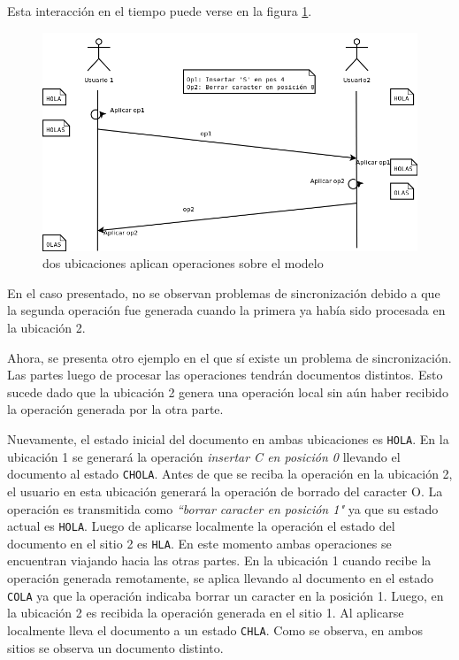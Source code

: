 \documentclass[12pt,a4paper]{article}
\begin{document}
	Esta interacción en el tiempo puede verse en la figura \ref{secuencia_ops_1}.

	\begin{figure}[!ht]
		\begin{center}
			\includegraphics[width=14cm]{sincronizacion_ok.png}
			\caption{\label{secuencia_ops_1} dos ubicaciones aplican operaciones sobre el modelo }
		\end{center}
	\end{figure}

	En el caso presentado, no se observan problemas de sincronización debido a que la segunda operación fue 
	generada cuando la primera ya había sido procesada en la ubicación 2.

	Ahora, se presenta otro ejemplo en el que sí existe un problema de sincronización. Las partes luego de procesar
	las operaciones tendrán documentos distintos. Esto sucede dado que la ubicación 2 genera una operación local 
	sin aún haber recibido la operación generada por la otra parte.
	
	Nuevamente, el estado inicial del documento en ambas ubicaciones es \texttt{HOLA}. En la ubicación 1
	se generará la operación \textit{insertar C en posición 0} llevando el documento al estado \texttt{CHOLA}.
	Antes de que se reciba la operación en la ubicación 2, el usuario en esta ubicación generará la operación
	de borrado del caracter O. La operación es transmitida como \textit{``borrar caracter en posición 1"} ya que
	su estado actual es \texttt{HOLA}. Luego de aplicarse localmente la operación el estado del documento en
	el sitio 2 es \texttt{HLA}.
	En este momento ambas operaciones se encuentran viajando hacia las otras partes. En la ubicación 1 cuando recibe
	la operación generada remotamente, se aplica llevando al documento en el estado \texttt{COLA} ya que la
	operación indicaba borrar un caracter en la posición 1. Luego, en la ubicación 2 es recibida la operación
	generada en el sitio 1. Al aplicarse localmente lleva el documento a un estado \texttt{CHLA}.
	Como se observa, en ambos sitios se observa un documento distinto.
\end{document}
